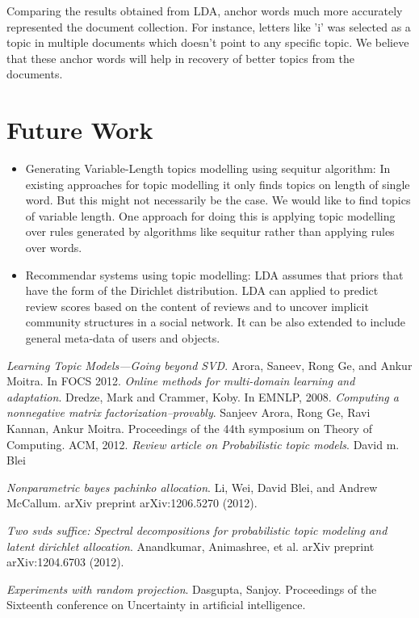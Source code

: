 \documentclass[a4paper,11pt]{article}
\begin{document}
Comparing the results obtained from LDA, anchor words much more accurately represented the document collection. For instance, letters like 'i' was selected as a topic in multiple documents which doesn't point to any specific topic. We believe that these anchor words will help in recovery of better topics from the documents.


\section{Future Work}

\begin{itemize}

\item Generating Variable-Length topics modelling using sequitur algorithm:
	In existing approaches for topic modelling it only finds topics on length of single word. But this might not necessarily be the case. We would like to find topics of variable length. One approach for doing this is applying topic modelling over rules generated by algorithms like sequitur rather than applying rules over words.

\item Recommendar systems using topic modelling:
	LDA assumes that priors that have the form of the Dirichlet distribution. LDA can applied to predict review scores based on the content of reviews and to uncover implicit community structures in a social network. It can be also extended to include general meta-data of users and objects.

\end{itemize}


\begin{thebibliography}{99}
 \textit{Learning Topic Models---Going beyond SVD}. Arora, Saneev, Rong Ge, and Ankur Moitra. In FOCS 2012.
 \textit{Online methods for multi-domain learning and adaptation}. Dredze, Mark and Crammer, Koby. In
EMNLP, 2008.
 \textit{Computing a nonnegative matrix factorization--provably}. Sanjeev Arora, Rong Ge, Ravi Kannan, Ankur Moitra. Proceedings of the 44th symposium on Theory of Computing. ACM, 2012.  
 \textit{Review article on Probabilistic topic models}. David m. Blei  

 \textit{Nonparametric bayes pachinko allocation}. Li, Wei, David Blei, and Andrew McCallum. arXiv preprint arXiv:1206.5270 (2012). 

 \textit{Two svds suffice: Spectral decompositions for probabilistic topic modeling and latent dirichlet allocation}. Anandkumar, Animashree, et al.  arXiv preprint arXiv:1204.6703 (2012).

 \textit{Experiments with random projection}. Dasgupta, Sanjoy. Proceedings of the Sixteenth conference on Uncertainty in artificial intelligence.


\end{thebibliography}

\pagebreak
\end{document}
